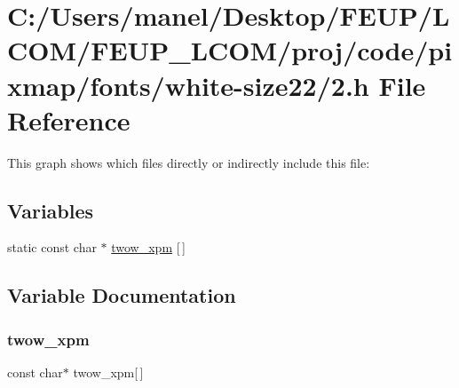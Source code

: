 \hypertarget{white-size22_22_8h}{}\section{C\+:/\+Users/manel/\+Desktop/\+F\+E\+U\+P/\+L\+C\+O\+M/\+F\+E\+U\+P\+\_\+\+L\+C\+O\+M/proj/code/pixmap/fonts/white-\/size22/2.h File Reference}
\label{white-size22_22_8h}
This graph shows which files directly or indirectly include this file\+:
\subsection*{Variables}
\begin{DoxyCompactItemize}
\item 
static const char $\ast$ \mbox{\hyperlink{white-size22_22_8h_a3207c85f8a600386924049f24f211349}{twow\+\_\+xpm}} \mbox{[}$\,$\mbox{]}
\end{DoxyCompactItemize}


\subsection{Variable Documentation}
\mbox{\label{white-size22_22_8h_a3207c85f8a600386924049f24f211349}} 
\subsubsection{\texorpdfstring{twow\_xpm}{twow\_xpm}}
{\footnotesize\ttfamily const char$\ast$ twow\+\_\+xpm\mbox{[}$\,$\mbox{]}\hspace{0.3cm}{\ttfamily [static]}}

